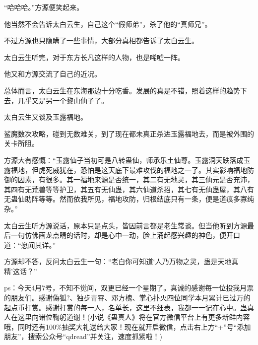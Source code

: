\begin{this_body}
“哈哈哈。”方源便笑起来。

他当然不会告诉太白云生，自己这个“假师弟”，杀了他的“真师兄”。

不过方源也只隐瞒了一些事情，大部分真相都告诉了太白云生。

太白云生听完，对于东方长凡这样的人物，也是唏嘘一阵。

他又和方源交流了自己的近况。

总体而言，太白云生在东海那边十分吃香。发展的真是不错，照着这样的趋势下去，几乎又是另一个黎山仙子了。

太白云生又谈及玉露福地。

鲨魔数次攻略，碰到无数难关，到了现在都未真正杀进玉露福地去，而是被外围的关卡所阻。

方源大有感慨：“玉露仙子当初可是八转蛊仙，师承乐土仙尊。玉露洞天跌落成玉露福地，但虎死威犹在，恐怕是这天底下最难攻伐的福地之一了。其实影响福地防御的因素，有很多。其一福地来源是否统一，其二有无地灵，其三仙元是否充沛，其四有无荒兽等等护卫，其五有无仙蛊，其六仙道杀招，其七有无仙蛊屋，其八有无蛊仙助阵等等。然而依我所见，福地攻防，归根结底只有一条，便是道痕多寡纯杂。”

太白云生听方源说话，原本只是点头，皆因前言都是老生常谈。但当他听到方源最后一句仿佛画龙点睛的话时，却是心中一动，脸上涌起感兴趣的神色，便开口道：“愿闻其详。”

方源却不答，反问太白云生一句：“老白你可知道‘人乃万物之灵，蛊是天地真精’这话？”

ps：今天4月7号，不知不觉间，双更已经一个星期了。真诚的感谢每一位投我月票的朋友们。感谢偽狐?、独步青霄、邓方槐、掌心扑火四位同学本月累计已过万的起点币打赏。感谢打赏的每一人，名单长，这里不细表，我都一一记在心中。蛊真人在这里向诸位鞠躬道谢！(小说《蛊真人》将在官方微信平台上有更多新鲜内容哦，同时还有100\%抽奖大礼送给大家！现在就开启微信，点击右上方“+”号“添加朋友”，搜索公众号“qdread”并关注，速度抓紧啦！)

\end{this_body}

